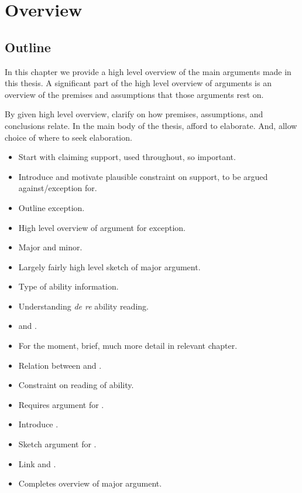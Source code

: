 
\chapter{Overview}
\label{cha:overview}

\section{Outline}
\label{sec:outline}

\begin{note}
  In this chapter we provide a high level overview of the main arguments made in this thesis.
  A significant part of the high level overview of arguments is an overview of the premises and assumptions that those arguments rest on.

  By given high level overview, clarify on how premises, assumptions, and conclusions relate.
  In the main body of the thesis, afford to elaborate.
  And, allow choice of where to seek elaboration.
\end{note}

\begin{itemize}
\item Start with claiming support, used throughout, so important.
\item Introduce and motivate plausible constraint on support, to be argued against/exception for.
\item Outline exception.
\item High level overview of argument for exception.
\item Major and minor.
\item Largely fairly high level sketch of major argument.
\item Type of ability information.
\item Understanding \emph{de re} ability reading.
\item \AR{} and \WR{}.
\item For the moment, brief, much more detail in relevant chapter.
\item Relation between \AR{} and \ESU{}.
\item Constraint on reading of ability.
\item Requires argument for \WR{}.
\item Introduce \nI{}.
\item Sketch argument for \nI{}.
\item Link \nI{} and \AR{}.
\item Completes overview of major argument.
\end{itemize}

